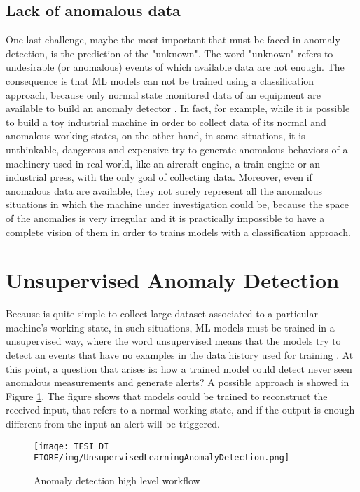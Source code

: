 \subsection{Lack of anomalous data}
One last challenge, maybe the most important that must be faced in anomaly detection, is the prediction of the "unknown". The word "unknown" refers to undesirable (or anomalous) events of which available data are not enough. The consequence is that ML models can not be trained using a classification approach, because only normal state monitored data of an equipment are available to build an anomaly detector \cite{7AnomalyDetectionUnsupervised}. In fact, for example, while it is possible to build a toy industrial machine in order to collect data of its normal and anomalous working states, on the other hand, in some situations, it is unthinkable, dangerous and expensive try to generate anomalous behaviors of a machinery used in real world, like an aircraft engine, a train engine or an industrial press, with the only goal of collecting data. Moreover, even if anomalous data are available, they not surely represent all the anomalous situations in which the machine under investigation could be, because the space of the anomalies is very irregular and it is practically impossible to have a complete vision of them in order to trains models with a classification approach.

\section{Unsupervised Anomaly Detection}
Because is quite simple to collect large dataset associated to a particular machine's working state, in such situations, ML models must be trained in a unsupervised way, where the word unsupervised means that the models try to detect an events that have no examples in the data history used for training \cite{8AnomalyDetectionUnsupervised2}. At this point, a question that arises is: how a trained model could detect never seen anomalous measurements and generate alerts? A possible approach is showed in Figure \ref{scoring_system_approach}. The figure shows that models could be trained to reconstruct the received input, that refers to a normal working state, and if the output is enough different from the input an alert will be triggered.

\begin{figure}[ht]
\texttt{[image: TESI DI FIORE/img/UnsupervisedLearningAnomalyDetection.png]}
\centering
\caption{Anomaly detection high level workflow \cite{7AnomalyDetectionUnsupervised}}
\label{scoring_system_approach}
\end{figure}

